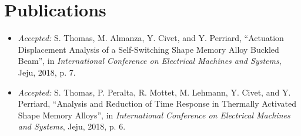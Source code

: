 \section{Publications}
\begin{itemize}
  \item \emph{Accepted:} S. Thomas, M. Almanza, Y. Civet, and Y. Perriard, ``Actuation Displacement Analysis of a Self-Switching Shape Memory Alloy Buckled Beam'', in \emph{International Conference on Electrical Machines and Systems}, Jeju, 2018, p. 7.
  \item \emph{Accepted:} S. Thomas, P. Peralta, R. Mottet, M. Lehmann, Y. Civet, and Y. Perriard, ``Analysis and Reduction of Time Response in Thermally Activated Shape Memory Alloys'', in \emph{International Conference on Electrical Machines and Systems}, Jeju, 2018, p. 6.
\end{itemize}
